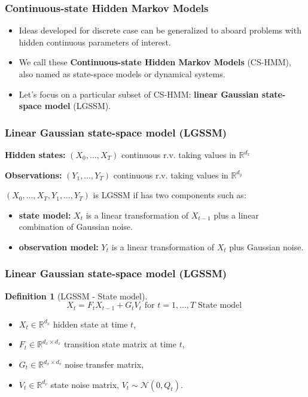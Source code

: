 \documentclass[xcolor=dvipsnames, compress]{beamer}
\newcommand{\R}{\ensuremath{\mathbb{R}}}
\newtheorem{defi}{Definition}[section]
\begin{document}
\begin{frame}
\frametitle{Continuous-state Hidden Markov Models}
\begin{itemize}	

	\item Ideas developed for discrete case can be generalized to aboard problems with hidden continuous parameters of interest.\vspace{0.5cm}
	\item We call these \textbf{Continuous-state Hidden Markov Models} (CS-HMM), also named as state-space models or dynamical systems.\vspace{0.5cm}
	\item Let's focus on a particular subset of CS-HMM: \textbf{linear Gaussian state-space model} (LGSSM).
\end{itemize}

\end{frame}


\begin{frame}
\frametitle{Linear Gaussian state-space model (LGSSM)}

\textbf{Hidden states:} $(X_0, \ldots, X_T)$ continuous r.v. taking values in $\R^{d_x}$

\textbf{Observations:} $(Y_1, \ldots, Y_T)$ continuous r.v. taking values in $\R^{d_y}$\vspace{0.5cm}

$(X_0, \ldots, X_T, Y_1, \ldots, Y_T)$ is LGSSM if has two components such as: 

\begin{itemize}
\item \textbf{state model:} $X_{t}$ is a linear transformation of $X_{t-1}$ plus a linear combination of Gaussian noise.\vspace{0.5cm}

\item \textbf{observation model:} $Y_{t}$ is a linear transformation of $X_{t}$ plus Gaussian noise.
\end{itemize}
\end{frame}

\begin{frame}
\frametitle{Linear Gaussian state-space model (LGSSM)}
\begin{defi}[LGSSM - State model]

\begin{equation}
X_t = F_t X_{t-1} + G_t V_t \mbox{ for } t=1, \ldots, T \mbox{ State model }
\end{equation}

\end{defi}

\begin{itemize}
	\item $X_t \in  \R^{d_x}$ hidden state at time $t$,
	\item $F_t \in  \R^{d_x \times d_x}$ transition state matrix at time $t$,
	\item $G_t \in  \R^{d_x \times d_v}$ noise transfer matrix,
	\item $V_t \in  \R^{d_v}$ state noise matrix, $V_t \sim \mathcal{N}(0,Q_t)$.
\end{itemize}

\end{frame}
\end{document}
